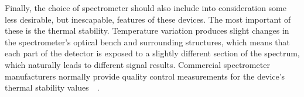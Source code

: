 Finally, the choice of spectrometer should also include into
consideration some less desirable, but inescapable,  features of these
devices. The most important of these is the thermal stability.
Temperature variation produces slight changes in the spectrometer's
optical bench and surrounding structures, which means that each part of
the detector is exposed to a slightly different section of the spectrum,
which naturally leads to different signal results. Commercial
spectrometer manufacturers normally provide quality control measurements
for the device's thermal stability
values~\cite{Merlaud2013}~.
